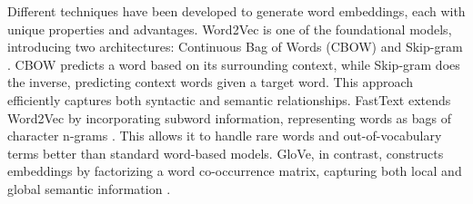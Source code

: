 \documentclass[english,version-2020-11]{uzl-thesis}
\begin{document}
Different techniques have been developed to generate word embeddings, each with unique properties and advantages. Word2Vec is one of the foundational models, introducing two architectures: Continuous Bag of Words (CBOW) and Skip-gram \cite{Mikolov2013}. CBOW predicts a word based on its surrounding context, while Skip-gram does the inverse, predicting context words given a target word. This approach efficiently captures both syntactic and semantic relationships. FastText extends Word2Vec by incorporating subword information, representing words as bags of character n-grams \cite{Bojanowski2017}. This allows it to handle rare words and out-of-vocabulary terms better than standard word-based models. GloVe, in contrast, constructs embeddings by factorizing a word co-occurrence matrix, capturing both local and global semantic information \cite{Pennington2014}.
\end{document}
